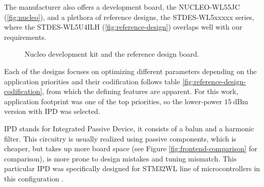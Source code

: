 The manufacturer also offers a development board, the NUCLEO-WL55JC (\ref{fig:nucleo}), and a plethora of reference designs, the STDES-WL5xxxxx series, where the STDES-WL5U4ILH (\ref{fig:reference-design}) overlaps well with our requirements.

\begin{figure}
    \centering
    \caption{\label{fig:nucleo-and-reference}Nucleo development kit and the reference design board.}
\end{figure}

Each of the designs focuses on optimizing different parameters depending on the application priorities and their codification follows table \ref{fig:reference-design-codification}, from which the defining features are apparent. For this work, application footprint was one of the top priorities, so the lower-power $15~\mathrm{dBm}$ version with IPD was selected.

IPD stands for Integrated Passive Device, it consists of a balun and a harmonic filter. This circuitry is usually realized using passive components, which is cheaper, but takes up more board space (see Figure \ref{fig:frontend-comparison} for comparison), is more prone to design mistakes and tuning mismatch. This particular IPD was specifically designed for STM32WL line of microcontrollers in this configuration \cite{stmicroelectronics_balfhb-wl-05d3_2024}.

